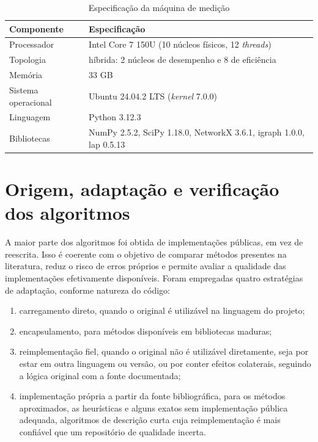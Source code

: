 \begin{table}[H]
    \centering
    \caption{Especificação da máquina de medição}
    \label{tab:maquina}
    \renewcommand{\arraystretch}{1.3}
    \footnotesize
    \begin{tabularx}{\textwidth}{@{} l X @{}}
        \toprule
        \textbf{Componente} & \textbf{Especificação} \\
        \midrule
        Processador & Intel Core 7 150U (10 núcleos físicos, 12 \textit{threads}) \\
        Topologia & híbrida: 2 núcleos de desempenho e 8 de eficiência \\
        Memória & 33 GB \\
        Sistema operacional & Ubuntu 24.04.2 LTS (\textit{kernel} 7.0.0) \\
        Linguagem & Python 3.12.3 \\
        Bibliotecas & NumPy 2.5.2, SciPy 1.18.0, NetworkX 3.6.1, igraph 1.0.0, lap 0.5.13 \\
        \bottomrule
    \end{tabularx}
\end{table}

\section{Origem, adaptação e verificação dos algoritmos}
\label{sec:proveniencia}

A maior parte dos algoritmos foi obtida de implementações públicas, em vez de reescrita. Isso é coerente com o objetivo de comparar métodos presentes na literatura, reduz o risco de erros próprios e permite avaliar a qualidade das implementações efetivamente disponíveis. Foram empregadas quatro estratégias de adaptação, conforme natureza do código:

\begin{enumerate}
    \item carregamento direto, quando o original é utilizável na linguagem do projeto;
    \item encapsulamento, para métodos disponíveis em bibliotecas maduras;
    \item reimplementação fiel, quando o original não é utilizável diretamente, seja por estar em outra linguagem ou versão, ou por conter efeitos colaterais, seguindo a lógica original com a fonte documentada;
    \item implementação própria a partir da fonte bibliográfica, para os métodos aproximados, as heurísticas e alguns exatos sem implementação pública adequada, algoritmos de descrição curta cuja reimplementação é mais confiável que um repositório de qualidade incerta.
\end{enumerate}

